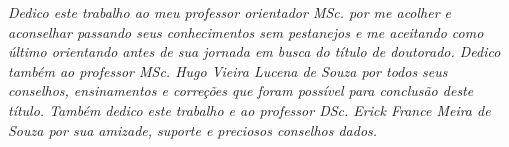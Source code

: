 \begin{dedicatoria}
	\vspace*{\fill}
		\centering
		\noindent
		\textit{ 
			Dedico este trabalho ao meu professor orientador MSc. \imprimirorientador  por me acolher e aconselhar passando seus conhecimentos sem pestanejos e me aceitando como último orientando antes de sua jornada em busca do título de doutorado. Dedico também ao professor MSc. Hugo Vieira Lucena de Souza por todos seus conselhos, ensinamentos e correções que foram possível para conclusão deste título. Também dedico este trabalho e ao professor DSc. Erick France Meira de Souza por sua amizade, suporte e preciosos conselhos dados.
		} \vspace*{\fill}
\end{dedicatoria}

